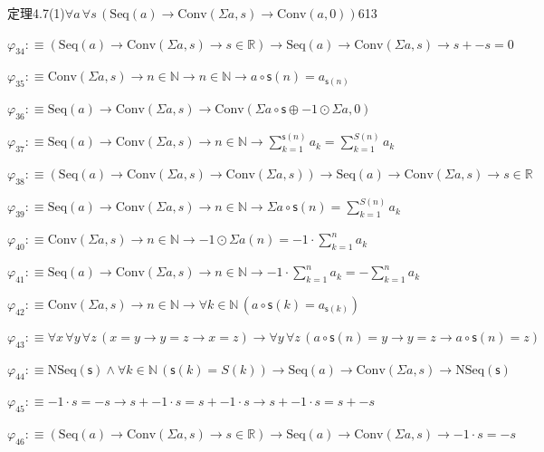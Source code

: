 \begin{fullproof}{定理4.7(1)}{$\forall a\,\forall s\,(\mathrm{Seq}(a) \to \mathrm{Conv}(\Sigma a,s) \to \mathrm{Conv}(a,0))$}{613}
\begin{abbrevlist}
\item $\varphi_{34} :\equiv (\mathrm{Seq}(a) \to \mathrm{Conv}(\Sigma a,s) \to s \in \mathbb{R}) \to \mathrm{Seq}(a) \to \mathrm{Conv}(\Sigma a,s) \to s + -s = 0$
\item $\varphi_{35} :\equiv \mathrm{Conv}(\Sigma a,s) \to n \in \mathbb{N} \to n \in \mathbb{N} \to a \circ \mathsf{s}(n) = a_{\mathsf{s}(n)}$
\item $\varphi_{36} :\equiv \mathrm{Seq}(a) \to \mathrm{Conv}(\Sigma a,s) \to \mathrm{Conv}(\Sigma a \circ \mathsf{s} \oplus -1 \odot \Sigma a,0)$
\item $\varphi_{37} :\equiv \mathrm{Seq}(a) \to \mathrm{Conv}(\Sigma a,s) \to n \in \mathbb{N} \to {\textstyle\sum_{k=1}^{\mathsf{s}(n)} a_{k}} = {\textstyle\sum_{k=1}^{S(n)} a_{k}}$
\item $\varphi_{38} :\equiv (\mathrm{Seq}(a) \to \mathrm{Conv}(\Sigma a,s) \to \mathrm{Conv}(\Sigma a,s)) \to \mathrm{Seq}(a) \to \mathrm{Conv}(\Sigma a,s) \to s \in \mathbb{R}$
\item $\varphi_{39} :\equiv \mathrm{Seq}(a) \to \mathrm{Conv}(\Sigma a,s) \to n \in \mathbb{N} \to \Sigma a \circ \mathsf{s}(n) = {\textstyle\sum_{k=1}^{S(n)} a_{k}}$
\item $\varphi_{40} :\equiv \mathrm{Conv}(\Sigma a,s) \to n \in \mathbb{N} \to -1 \odot \Sigma a(n) = -1 \cdot {\textstyle\sum_{k=1}^{n} a_{k}}$
\item $\varphi_{41} :\equiv \mathrm{Seq}(a) \to \mathrm{Conv}(\Sigma a,s) \to n \in \mathbb{N} \to -1 \cdot {\textstyle\sum_{k=1}^{n} a_{k}} = -{\textstyle\sum_{k=1}^{n} a_{k}}$
\item $\varphi_{42} :\equiv \mathrm{Conv}(\Sigma a,s) \to n \in \mathbb{N} \to \forall k \in \mathbb{N}\,(a \circ \mathsf{s}(k) = a_{\mathsf{s}(k)})$
\item $\varphi_{43} :\equiv \forall x\,\forall y\,\forall z\,(x = y \to y = z \to x = z) \to \forall y\,\forall z\,(a \circ \mathsf{s}(n) = y \to y = z \to a \circ \mathsf{s}(n) = z)$
\item $\varphi_{44} :\equiv \mathrm{NSeq}(\mathsf{s}) \land \forall k \in \mathbb{N}\,(\mathsf{s}(k) = S(k)) \to \mathrm{Seq}(a) \to \mathrm{Conv}(\Sigma a,s) \to \mathrm{NSeq}(\mathsf{s})$
\item $\varphi_{45} :\equiv -1 \cdot s = -s \to s + -1 \cdot s = s + -1 \cdot s \to s + -1 \cdot s = s + -s$
\item $\varphi_{46} :\equiv (\mathrm{Seq}(a) \to \mathrm{Conv}(\Sigma a,s) \to s \in \mathbb{R}) \to \mathrm{Seq}(a) \to \mathrm{Conv}(\Sigma a,s) \to -1 \cdot s = -s$

\end{abbrevlist}
\end{fullproof}
